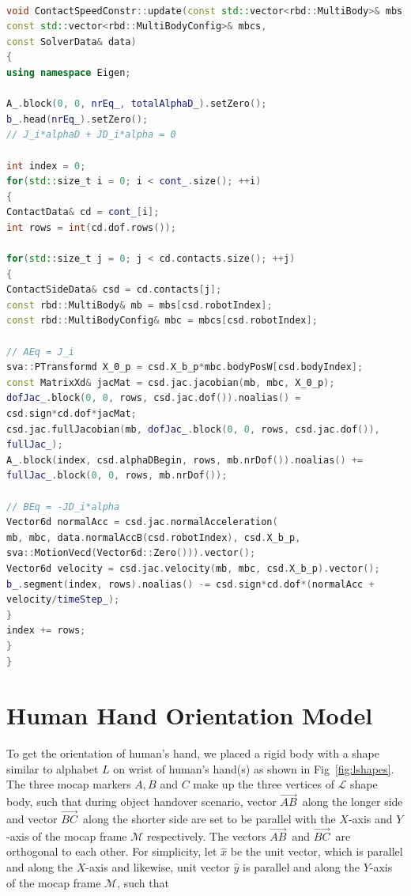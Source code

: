 \begin{lstlisting}[language=C++,basicstyle=\footnotesize, caption={QPContactConstr}]

void ContactSpeedConstr::update(const std::vector<rbd::MultiBody>& mbs,
const std::vector<rbd::MultiBodyConfig>& mbcs,
const SolverData& data)
{
using namespace Eigen;

A_.block(0, 0, nrEq_, totalAlphaD_).setZero();
b_.head(nrEq_).setZero();
// J_i*alphaD + JD_i*alpha = 0

int index = 0;
for(std::size_t i = 0; i < cont_.size(); ++i)
{
ContactData& cd = cont_[i];
int rows = int(cd.dof.rows());

for(std::size_t j = 0; j < cd.contacts.size(); ++j)
{
ContactSideData& csd = cd.contacts[j];
const rbd::MultiBody& mb = mbs[csd.robotIndex];
const rbd::MultiBodyConfig& mbc = mbcs[csd.robotIndex];

// AEq = J_i
sva::PTransformd X_0_p = csd.X_b_p*mbc.bodyPosW[csd.bodyIndex];
const MatrixXd& jacMat = csd.jac.jacobian(mb, mbc, X_0_p);
dofJac_.block(0, 0, rows, csd.jac.dof()).noalias() =
csd.sign*cd.dof*jacMat;
csd.jac.fullJacobian(mb, dofJac_.block(0, 0, rows, csd.jac.dof()),
fullJac_);
A_.block(index, csd.alphaDBegin, rows, mb.nrDof()).noalias() +=
fullJac_.block(0, 0, rows, mb.nrDof());

// BEq = -JD_i*alpha
Vector6d normalAcc = csd.jac.normalAcceleration(
mb, mbc, data.normalAccB(csd.robotIndex), csd.X_b_p,
sva::MotionVecd(Vector6d::Zero())).vector();
Vector6d velocity = csd.jac.velocity(mb, mbc, csd.X_b_p).vector();
b_.segment(index, rows).noalias() -= csd.sign*cd.dof*(normalAcc +
velocity/timeStep_);
}
index += rows;
}
}
\end{lstlisting}


\clearpage
\section{Human Hand Orientation Model}\label{hand_orientation}
To get the orientation of human's hand, we placed a rigid body with a shape similar to alphabet $L$ on wrist of human's hand(s) as shown in Fig~\ref{fig:lshapes}. The three mocap markers $A, B$ and $C$ make up the three vertices of $\mathcal{L}$ shape body, such that during object handover scenario, vector $\vec{AB}^{\,}$ along the longer side and vector $\vec{BC}^{\,}$ along the shorter side are set to be parallel with the $X$-axis and $Y$-axis of the mocap frame $\mathcal{M}$ respectively. The vectors $\vec{AB}^{\,}$ and $\vec{BC}^{\,}$ are orthogonal to each other. For simplicity, let $\hat{x}$ be the unit vector, which is parallel and along the $X$-axis and likewise, unit vector $\hat{y}$ is parallel and along the $Y$-axis of the mocap frame $\mathcal{M}$, such that

